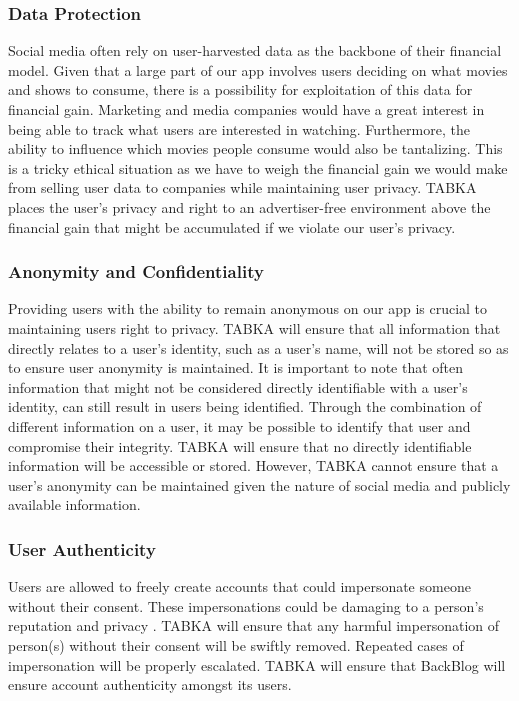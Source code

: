 \documentclass[12pt,asmart]{report}
\begin{document}
\subsubsection{Data Protection}
Social media often rely on user-harvested data as the backbone of their financial model. Given that a large part of our app involves users deciding on what movies and shows to consume, there is a possibility for exploitation of this data for financial gain. Marketing and media companies would have a great interest in being able to track what users are interested in watching. Furthermore, the ability to influence which movies people consume would also be tantalizing. This is a tricky ethical situation as we have to weigh the financial gain we would make from selling user data to companies while maintaining user privacy. TABKA places the user's privacy and right to an advertiser-free environment above the financial gain that might be accumulated if we violate our user's privacy.

\subsubsection{Anonymity and Confidentiality}
Providing users with the ability to remain anonymous on our app is crucial to maintaining users right to privacy. TABKA will ensure that all information that directly relates to a user's identity, such as a user's name, will not be stored so as to ensure user anonymity is maintained. It is important to note that often information that might not be considered directly identifiable with a user's identity, can still result in users being identified. Through the combination of different information on a user, it may be possible to identify that user and compromise their integrity. TABKA will ensure that no directly identifiable information will be accessible or stored. However, TABKA cannot ensure that a user's anonymity can be maintained given the nature of social media and publicly available information.

\subsubsection{User Authenticity}
Users are allowed to freely create accounts that could impersonate someone without their consent. These impersonations could be damaging to a person's reputation and privacy \cite{Reichart_Smith2017-fe} \cite{Cox2014-sl}. TABKA will ensure that any harmful impersonation of person(s) without their consent will be swiftly removed. Repeated cases of impersonation will be properly escalated. TABKA will ensure that BackBlog will ensure account authenticity amongst its users.
\end{document}
